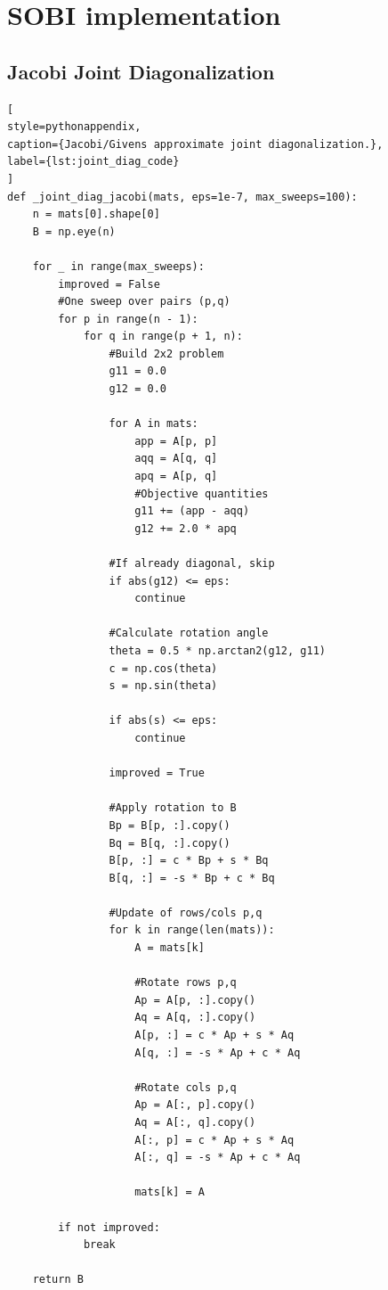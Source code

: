 \section{SOBI implementation}
\subsection{Jacobi Joint Diagonalization}
\label{app:joint_diag_code}
\begin{lstlisting}[
style=pythonappendix,
caption={Jacobi/Givens approximate joint diagonalization.},
label={lst:joint_diag_code}
]
def _joint_diag_jacobi(mats, eps=1e-7, max_sweeps=100):
    n = mats[0].shape[0]
    B = np.eye(n)

    for _ in range(max_sweeps):
        improved = False
        #One sweep over pairs (p,q)
        for p in range(n - 1):
            for q in range(p + 1, n):
                #Build 2x2 problem 
                g11 = 0.0
                g12 = 0.0

                for A in mats:
                    app = A[p, p]
                    aqq = A[q, q]
                    apq = A[p, q]
                    #Objective quantities
                    g11 += (app - aqq)
                    g12 += 2.0 * apq

                #If already diagonal, skip
                if abs(g12) <= eps:
                    continue

                #Calculate rotation angle
                theta = 0.5 * np.arctan2(g12, g11)
                c = np.cos(theta)
                s = np.sin(theta)

                if abs(s) <= eps:
                    continue

                improved = True

                #Apply rotation to B
                Bp = B[p, :].copy()
                Bq = B[q, :].copy()
                B[p, :] = c * Bp + s * Bq
                B[q, :] = -s * Bp + c * Bq

                #Update of rows/cols p,q
                for k in range(len(mats)):
                    A = mats[k]

                    #Rotate rows p,q
                    Ap = A[p, :].copy()
                    Aq = A[q, :].copy()
                    A[p, :] = c * Ap + s * Aq
                    A[q, :] = -s * Ap + c * Aq

                    #Rotate cols p,q
                    Ap = A[:, p].copy()
                    Aq = A[:, q].copy()
                    A[:, p] = c * Ap + s * Aq
                    A[:, q] = -s * Ap + c * Aq

                    mats[k] = A

        if not improved:
            break

    return B
\end{lstlisting}

